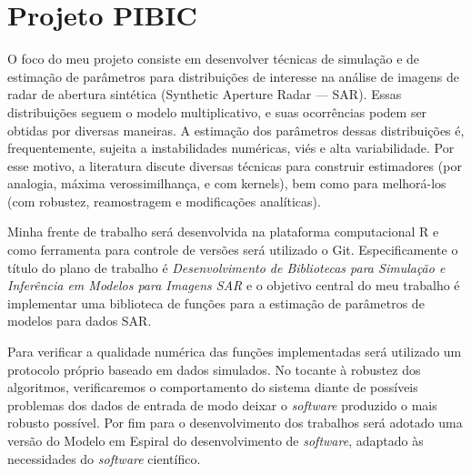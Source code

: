 \documentclass[a4paper, 12pt, english]{article}
\begin{document}
\section{Projeto PIBIC}

O foco do meu projeto consiste em desenvolver técnicas de simulação e de estimação de parâmetros para distribuições de interesse na análise de imagens de radar de abertura sintética (Synthetic Aperture Radar — SAR). Essas
distribuições seguem o modelo multiplicativo, e suas ocorrências podem ser obtidas por diversas maneiras.
A estimação dos parâmetros dessas distribuições é, frequentemente, sujeita a instabilidades numéricas, viés
e alta variabilidade. Por esse motivo, a literatura discute diversas técnicas para construir estimadores (por 
analogia, máxima verossimilhança, e com kernels), bem como para melhorá-los (com robustez, reamostragem e modificações analíticas).

Minha frente de trabalho será desenvolvida na plataforma computacional R e como ferramenta para controle de versões será utilizado o Git. Especificamente o título do plano de trabalho é \textit{Desenvolvimento de Bibliotecas para Simulação e Inferência em Modelos para Imagens SAR} e o objetivo central do meu trabalho é implementar uma biblioteca de funções para a estimação de parâmetros de modelos para dados SAR.

Para verificar a qualidade numérica das funções implementadas será utilizado um protocolo próprio baseado em dados simulados. No tocante à robustez dos algoritmos, verificaremos o comportamento do sistema diante de possíveis problemas dos dados de entrada de modo deixar o \textit{software} produzido o mais robusto possível. Por fim para o desenvolvimento dos trabalhos será adotado uma versão do Modelo em Espiral do desenvolvimento de \textit{software}, adaptado às necessidades do \textit{software} científico.
\end{document}
